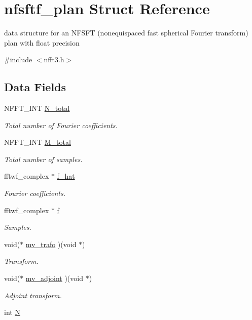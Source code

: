 \hypertarget{structnfsftf__plan}{\section{nfsftf\-\_\-plan Struct Reference}
\label{structnfsftf__plan}
}


data structure for an N\-F\-S\-F\-T (nonequispaced fast spherical Fourier transform) plan with float precision  




{\ttfamily \#include $<$nfft3.\-h$>$}

\subsection*{Data Fields}
\begin{DoxyCompactItemize}
\item 
N\-F\-F\-T\-\_\-\-I\-N\-T \hyperlink{structnfsftf__plan_a2f04edb65331f44c28ac8cc2f085ddfc}{N\-\_\-total}
\begin{DoxyCompactList}\small\item\em Total number of Fourier coefficients. \end{DoxyCompactList}\item 
N\-F\-F\-T\-\_\-\-I\-N\-T \hyperlink{structnfsftf__plan_a0ff9eee8adb478327be54a97ed113e63}{M\-\_\-total}
\begin{DoxyCompactList}\small\item\em Total number of samples. \end{DoxyCompactList}\item 
fftwf\-\_\-complex $\ast$ \hyperlink{structnfsftf__plan_a840547e30414a41c3751e2b418f76312}{f\-\_\-hat}
\begin{DoxyCompactList}\small\item\em Fourier coefficients. \end{DoxyCompactList}\item 
fftwf\-\_\-complex $\ast$ \hyperlink{structnfsftf__plan_a7cfd191a4353a736bf9045c7e1d46f70}{f}
\begin{DoxyCompactList}\small\item\em Samples. \end{DoxyCompactList}\item 
void($\ast$ \hyperlink{structnfsftf__plan_a417f0b7f48ab77d5af34ed1da9ba95c9}{mv\-\_\-trafo} )(void $\ast$)
\begin{DoxyCompactList}\small\item\em Transform. \end{DoxyCompactList}\item 
void($\ast$ \hyperlink{structnfsftf__plan_af4deec395e0a4650b1e108677b787900}{mv\-\_\-adjoint} )(void $\ast$)
\begin{DoxyCompactList}\small\item\em Adjoint transform. \end{DoxyCompactList}\item 
\hypertarget{structnfsftf__plan_a09b711da345edffb8a71b5b8a8bca6d0}{int \hyperlink{structnfsftf__plan_a09b711da345edffb8a71b5b8a8bca6d0}{N}}\label{structnfsftf__plan_a09b711da345edffb8a71b5b8a8bca6d0}


\end{DoxyCompactItemize}
